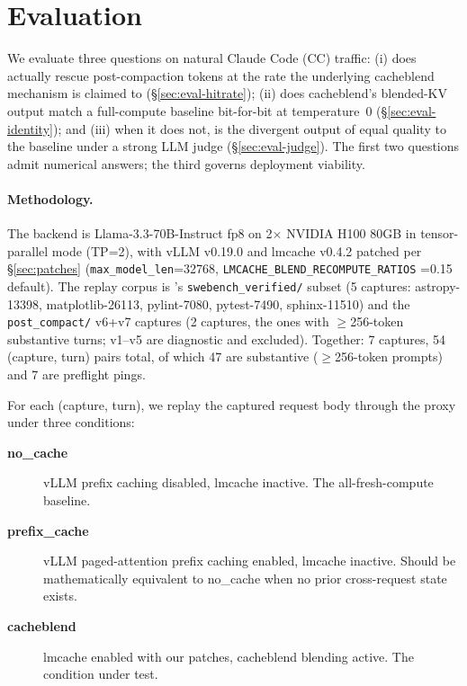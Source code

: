 
\section{Evaluation}
\label{sec:evaluation}

We evaluate three questions on natural Claude Code (CC) traffic:
(i) does \sys{} actually rescue post-compaction tokens at the rate the
underlying cacheblend mechanism is claimed to (\S\ref{sec:eval-hitrate});
(ii) does cacheblend's blended-KV output match a full-compute baseline
bit-for-bit at temperature~0 (\S\ref{sec:eval-identity}); and (iii) when
it does not, is the divergent output of equal quality to the baseline
under a strong LLM judge (\S\ref{sec:eval-judge}). The first two
questions admit numerical answers; the third governs deployment
viability.

\paragraph{Methodology.} The backend is Llama-3.3-70B-Instruct fp8 on
2$\times$ NVIDIA H100 80GB in tensor-parallel mode (TP=2), with
vLLM v0.19.0 and lmcache v0.4.2 patched per \S\ref{sec:patches}
(\texttt{max\_model\_len}=32768, \texttt{LMCACHE\_BLEND\_RECOMPUTE\_RATIOS}
=0.15 default). The replay corpus is \dataset's
\texttt{swebench\_verified/} subset (5 captures: astropy-13398,
matplotlib-26113, pylint-7080, pytest-7490, sphinx-11510) and the
\texttt{post\_compact/} v6+v7 captures (2 captures, the ones with
$\geq$256-token substantive turns; v1--v5 are diagnostic and excluded).
Together: 7 captures, 54 (capture, turn) pairs total, of which 47 are
substantive ($\geq$256-token prompts) and 7 are preflight pings.

For each (capture, turn), we replay the captured request body through
the proxy under three conditions:

\begin{description}
\item[\textbf{no\_cache}] vLLM prefix caching disabled, lmcache
  inactive. The all-fresh-compute baseline.
\item[\textbf{prefix\_cache}] vLLM paged-attention prefix caching
  enabled, lmcache inactive. Should be mathematically equivalent to
  no\_cache when no prior cross-request state exists.
\item[\textbf{cacheblend}] lmcache enabled with our patches, cacheblend
  blending active. The condition under test.
\end{description}


